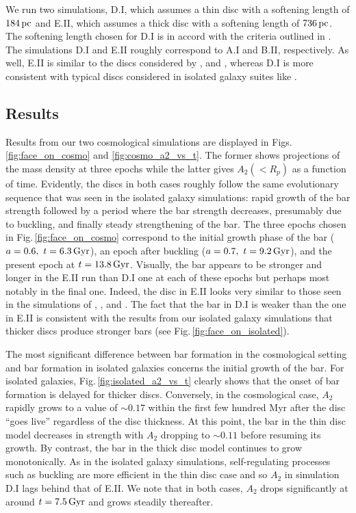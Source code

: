 We run two simulations, D.I, which assumes a thin disc with a
softening length of $184\,{\rm pc}$ and E.II, which assumes a thick
disc with a softening length of $736\,{\rm pc}$.  The softening length
chosen for D.I is in accord with the criteria outlined in
\citet{power_et_al_2003}.  The simulations D.I and E.II roughly
correspond to A.I and B.II, respectively.  As well, E.II is similar to
the discs considered by \citet{DeBuhrStellarDisks},
\citet{YurinSpringelStellarDisks} and \citet{Bauer2018a}, whereas D.I
is more consistent with typical discs considered in isolated galaxy
suites like \citet{WPDGalactICSReference}.

\subsection{Results}

Results from our two cosmological simulations are displayed in
Figs.\,\ref{fig:face_on_cosmo} and \ref{fig:cosmo_a2_vs_t}.  The
former shows projections of the mass density at three epochs while the
latter gives $A_2(<R_p)$ as a function of time.  Evidently, the discs
in both cases roughly follow the same evolutionary sequence that was seen in
the isolated galaxy simulations: rapid growth of the bar strength
followed by a period where the bar strength decreases,
presumably due to buckling, and finally steady strengthening of the
bar.  The three epochs chosen in Fig.\,\ref{fig:face_on_cosmo}
correspond to the initial growth phase of the bar
($a=0.6,~t=6.3\,{\rm Gyr}$), an epoch after buckling
($a=0.7,~t = 9.2\,{\rm Gyr}$), and the present epoch at
$t=13.8\,{\rm Gyr}$.  Visually, the bar appears to be stronger and
longer in the E.II run than D.I one at each of these epochs but
perhaps most notably in the final one.  Indeed, the disc in E.II looks
very similar to those seen in the simulations of
\citet{DeBuhrStellarDisks}, \citet{YurinSpringelStellarDisks}, and
\citet{Bauer2018a}.  The fact that the bar in D.I is weaker than the
one in E.II is consistent with the results from our isolated galaxy
simulations that thicker discs produce stronger bars (see
Fig.\,\ref{fig:face_on_isolated}).

The most significant difference between bar formation in the
cosmological setting and bar formation in isolated galaxies concerns
the initial growth of the bar.  For isolated galaxies,
Fig.\,\ref{fig:isolated_a2_vs_t} clearly shows that the onset of bar
formation is delayed for thicker discs.  Conversely, in the
cosmological case, $A_2$ rapidly grows to a value of $\sim 0.17$
within the first few hundred Myr after the disc ``goes live''
regardless of the disc thickness.  At this point, the bar in the thin
disc model decreases in strength with $A_2$ dropping to $\sim 0.11$
before resuming its growth.  By contrast, the bar in the thick disc
model continues to grow monotonically.  As in the isolated galaxy
simulations, self-regulating processes such as buckling are more
efficient in the thin disc case and so $A_2$ in simulation D.I lags
behind that of E.II.  We note that in both cases, $A_2$ drops
significantly at around $t=7.5\,{\rm Gyr}$ and grows steadily
thereafter.

